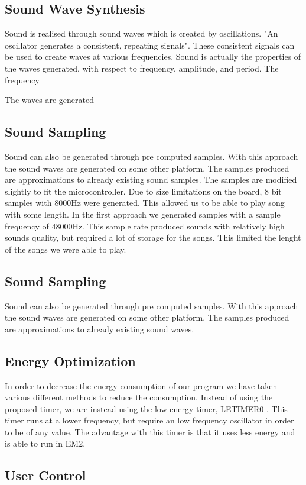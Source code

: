 \subsection{Sound Wave Synthesis}
Sound is realised through sound waves which is created by oscillations. "An oscillator generates a consistent, repeating signals". These consistent signals can be used to create waves at various frequencies. Sound is actually the properties of the waves generated, with respect to frequency, amplitude, and period. The frequency 

The waves are generated  

\subsection{Sound Sampling}
Sound can also be generated through pre computed samples. With this approach the sound waves are generated on some other platform. The samples produced are approximations to already existing sound samples. The samples are modified slightly to fit the microcontroller. Due to size limitations on the board, 8 bit samples with 8000Hz were generated. This allowed us to be able to play song with some length. In the first approach we generated samples with a sample frequency of 48000Hz. This sample rate produced sounds with relatively high sounds quality, but required a lot of storage for the songs. This limited the lenght of the songs we were able to play. 

\subsection{Sound Sampling}
Sound can also be generated through pre computed samples. With this approach the sound waves are generated on some other platform. The samples produced are approximations to already existing sound waves.


\subsection{Energy Optimization}
In order to decrease the energy consumption of our program we have taken various different methods to reduce the consumption. Instead of using the proposed timer\cite{compendium}, we are instead using the low energy timer, LETIMER0 \cite{EFM32GG-rm}. This timer runs at a lower frequency, but require an low frequency oscillator in order to be of any value. The advantage with this timer is that it uses less energy and is able to run in EM2.  



\subsection{User Control}













